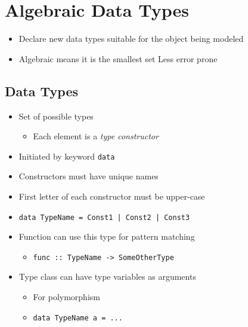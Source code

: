 
\section{Algebraic Data Types}
\begin{itemize}
    \item Declare new data types suitable for the object being modeled
    \item Algebraic means it is the smallest set
    \ipro Less error prone
\end{itemize}

\subsection{Data Types}
\begin{itemize}
        \begin{itemize}
            \item Set of possible types
                \begin{itemize}
                    \item Each element is a \textit{type constructor}
                \end{itemize}
            \item Initiated by keyword \verb+data+
            \item Constructors must have unique names
            \item First letter of each constructor must be upper-case
            \item \verb+data TypeName = Const1 | Const2 | Const3+
            \item Function can use this type for pattern matching
                \begin{itemize}
                    \item \verb+func :: TypeName -> SomeOtherType+
                \end{itemize}
            \item Type class can have type variables as arguments
                \begin{itemize}
                    \item For polymorphism
                    \item \verb+data TypeName a = ...+
                \end{itemize}
        \end{itemize}
        \begin{itemize}

\end{itemize}
\end{itemize}
